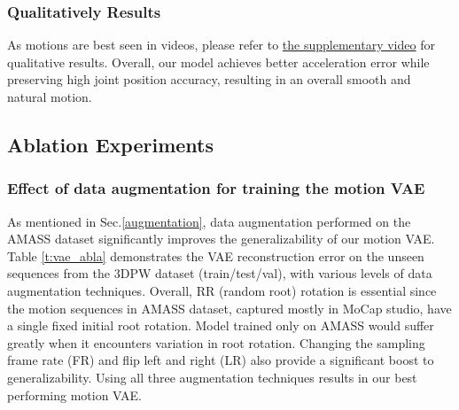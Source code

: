 \documentclass[runningheads]{llncs}
\begin{document}
\subsubsection{Qualitatively Results}


As motions are best seen in videos, please refer to \href{https://youtu.be/YBb9NDz3ngM}{the supplementary video} for qualitative results. Overall, our model achieves better acceleration error while preserving high joint position accuracy, resulting in an overall smooth and natural motion. 


\subsection{Ablation Experiments}
\label{abla}

\subsubsection{Effect of data augmentation for training the motion VAE}
\label{abla_augmentation}
As mentioned in Sec.\ref{augmentation}, data augmentation performed on the AMASS dataset significantly improves the generalizability of our motion VAE. Table \ref{t:vae_abla} demonstrates the VAE reconstruction error on the unseen sequences from the 3DPW dataset (train/test/val), with various levels of data augmentation techniques. Overall, RR (random root) rotation is essential since the motion sequences in AMASS dataset, captured mostly in MoCap studio, have a single fixed initial root rotation. Model trained only on AMASS would suffer greatly when it encounters variation in root rotation. Changing the sampling frame rate (FR) and flip left and right (LR) also provide a significant boost to generalizability. Using all three augmentation techniques results in our best performing motion VAE. 
\end{document}
